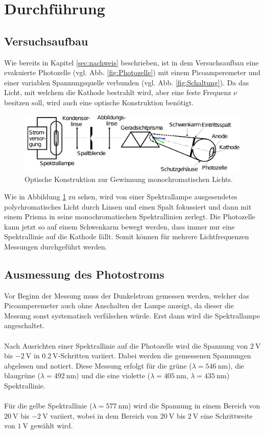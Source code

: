 \section{Durchführung}
\label{sec:Durchführung}

\subsection{Versuchsaufbau}
\label{sec:Aufbau}
Wie bereits in Kapitel \ref{sec:nachweis} beschrieben, ist in dem Versuchsaufbau eine evakuierte Photozelle (vgl. Abb. \ref{fig:Photozelle}) mit einem
Picoamperemeter und einer variablen Spannungsquelle verbunden (vgl. Abb. \ref{fig:Schaltung}). Da das Licht, mit welchem die Kathode
bestrahlt wird, aber eine feste Frequenz $\nu$ besitzen soll, wird auch eine optische Konstruktion benötigt.
\begin{figure}
    \centering
    \includegraphics[scale=0.3]{pictures/OptischerTeil.png}
    \caption{Optische Konstruktion zur Gewinnung monochromatischen Lichts. \cite{AP01}}
    \label{fig:optisch}
\end{figure}
Wie in Abbildung \ref{fig:optisch} zu sehen, wird von einer
Spektrallampe ausgesendetes polychromatisches Licht durch Linsen und einen Spalt fokussiert und dann mit einem Prisma in seine monochromatischen
Spektrallinien zerlegt. Die Photozelle kann jetzt so auf einem Schwenkarm bewegt werden, dass immer nur eine Spektrallinie auf die Kathode
fällt. Somit können für mehrere Lichtfrequenzen Messungen durchgeführt werden.

\subsection{Ausmessung des Photostroms}
\label{sec:ausmessen}
Vor Beginn der Messung muss der Dunkelstrom gemessen werden, welcher das Picoamperemeter auch ohne Anschalten der Lampe anzeigt, da dieser
die Messung sonst systematisch verfälschen würde. Erst dann wird die Spektrallampe angeschaltet.
\\
\\
\noindent
Nach Ausrichten einer Spektrallinie auf die Photozelle wird die Spannung von $\SI{2}{\volt}$ bis
$\SI{-2}{\volt}$ in $\SI{0.2}{\volt}$-Schritten variiert. Dabei werden die gemessenen Spannungen abgelesen und notiert. Diese Messung
erfolgt für die grüne ($\lambda=\SI{546}{\nano\metre}$), die blaugrüne ($\lambda=\SI{492}{\nano\metre}$) und die eine violette
($\lambda=\SI{405}{\nano\metre}$, $\lambda=\SI{435}{\nano\metre}$) Spektrallinie.
\\
\\
\noindent
Für die gelbe Spektrallinie ($\lambda=\SI{577}{\nano\metre}$) wird die Spannung in einem Bereich von $\SI{20}{\volt}$ bis $\SI{-2}{\volt}$
variiert, wobei in dem Bereich von $\SI{20}{\volt}$ bis $\SI{2}{\volt}$ eine Schrittweite von $\SI{1}{\volt}$ gewählt wird.
